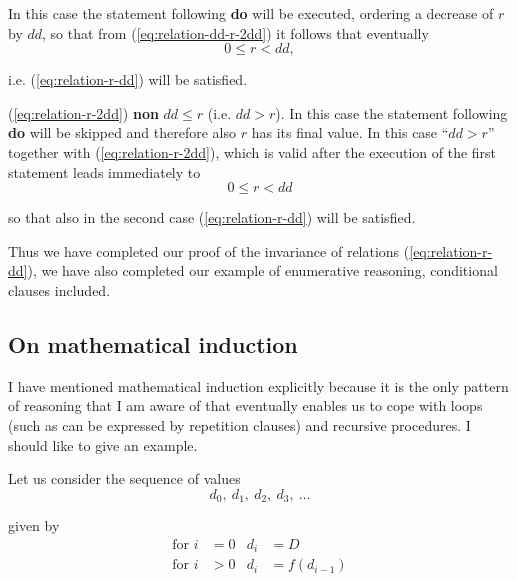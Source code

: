 \noindent
In this case the statement following \textbf{do} will be executed, ordering a decrease of $r$ by $dd$, so that from (\ref{eq:relation-dd-r-2dd}) it follows that eventually
\begin{equation*}
	0 \leqslant r < dd,
\end{equation*}

\noindent
i.e. (\ref{eq:relation-r-dd}) will be satisfied.

(\ref{eq:relation-r-2dd}) \textbf{non} $dd \leqslant r$ (i.e. $dd > r$). In this case the statement following \textbf{do} will be skipped and therefore also $r$ has its final value. In this case ``$dd > r$'' together with (\ref{eq:relation-r-2dd}), which is valid after the execution of the first statement leads immediately to
\begin{equation*}
	0 \leqslant r < dd
\end{equation*}

\noindent
so that also in the second case (\ref{eq:relation-r-dd}) will be satisfied.

Thus we have completed our proof of the invariance of relations (\ref{eq:relation-r-dd}), we have also completed our example of enumerative reasoning, conditional clauses included.

\subsection{On mathematical induction}
\label{subsec:mathematical-induction}

I have mentioned mathematical induction explicitly because it is the only pattern of reasoning that I am aware of that eventually enables us to cope with loops (such as can be expressed by repetition clauses) and recursive procedures. I should like to give an example.

Let us consider the sequence of values
\begin{equation}
	\label{eq:induction-d}
	d_0,\ d_1,\ d_2,\ d_3,\ \dotso
\end{equation}

\noindent
given by
\begin{subequations}
\begin{align}
	\label{eq:induction-for-a}
	\text{for } i &= 0 & d_i &= D \\
	\label{eq:induction-for-b}
	\text{for } i &> 0 & d_i &= f(d_{i-1})
\end{align}
\end{subequations}

